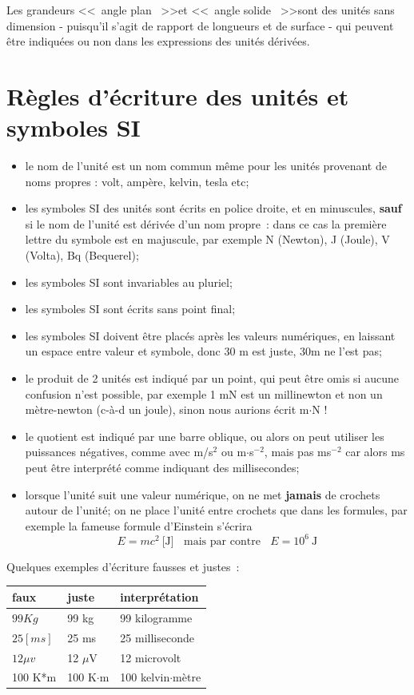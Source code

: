 Les grandeurs \textless\textless\ angle plan \ \textgreater\textgreater et \textless\textless\ angle solide \ \textgreater\textgreater sont des unités sans dimension - puisqu'il s'agit de rapport de longueurs et de surface - qui peuvent être indiquées ou non dans les expressions des unités dérivées.

\section{Règles d'écriture des unités et symboles SI}

\begin{itemize}\itemsep1pt
\renewcommand{\labelitemi}{$\bullet$}
\item le nom de l'unité est un nom commun même pour les unités provenant de noms propres : volt, ampère, kelvin, tesla etc;
\item les symboles SI des unités sont écrits en police droite, et en minuscules, \textbf{sauf} si le nom de l'unité est dérivée d'un nom propre~: dans ce cas la première lettre du symbole est en majuscule, par exemple N (Newton), J (Joule), V (Volta), Bq (Bequerel);
\item les symboles SI sont invariables au pluriel;
\item les symboles SI sont écrits sans point final;
\item les symboles SI doivent être placés après les valeurs numériques, en laissant un espace entre valeur et symbole, donc 30 m est juste, 30m ne l'est pas;
\item le produit de 2 unités est indiqué par un point, qui peut être omis si aucune confusion n'est possible, par exemple 1 mN est un millinewton et non un mètre-newton (c-à-d un joule), sinon nous aurions écrit m$\cdot$N !
\item le quotient est indiqué par une barre oblique, ou alors on peut utiliser les puissances négatives, comme avec m/s$^2$ ou m$\cdot$s$^{-2}$, mais pas ms$^{-2}$ car alors ms peut être interprété comme indiquant des millisecondes;
\item lorsque l'unité suit une valeur numérique, on ne met \textbf{jamais} de crochets autour de l'unité; on ne place l'unité entre crochets que dans les formules, par exemple la fameuse formule d'Einstein s'écrira
$$
E=mc^2\ \text{[J]}\ \ \ \ \text{mais par contre}\ \ \ \ E=10^6\ \text{J}
$$
\end{itemize}
Quelques exemples d'écriture  fausses et justes~:
\begin{center}
\begin{tabular}{lll}
faux & juste & interprétation\\\hline
$99Kg$& 99 kg & 99 kilogramme\\
$25 [ms]$ & 25 ms & 25 milliseconde\\
$12 \mu v$ & 12 $\mu$V & 12 microvolt\\
100 K*m & 100 K$\cdot$m & 100 kelvin$\cdot$mètre\\\hline
\end{tabular}
\end{center}


